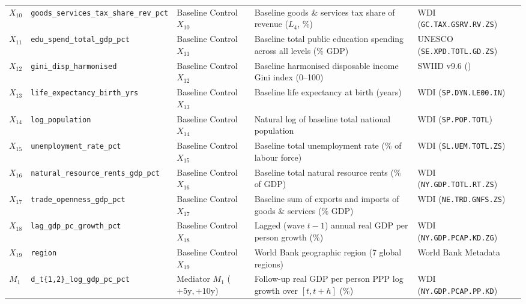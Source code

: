 \documentclass[11pt,a4paper]{article}
\newcommand{\co}{\cellcolor{colodd}}
\newcommand{\ce}{\cellcolor{coleven}}
\begin{document}
\begin{table}[htbp]
{\begin{tabular}{l|l|l|l|l}
    \rowcolor{roweven}
    \textbf{$X_{10}$} & \ce \texttt{goods\_services\_tax\_share\_rev\_pct} & Baseline Control $X_{10}$ & \ce Baseline goods \& services tax share of revenue ($L_4$, \%) & WDI (\texttt{GC.TAX.GSRV.RV.ZS}) \\
    \rowcolor{rowodd}
    \textbf{$X_{11}$} & \co \texttt{edu\_spend\_total\_gdp\_pct} & Baseline Control $X_{11}$ & \co Baseline total public education spending across all levels (\% GDP) & UNESCO (\texttt{SE.XPD.TOTL.GD.ZS}) \\
    \rowcolor{roweven}
    \textbf{$X_{12}$} & \ce \texttt{gini\_disp\_harmonised} & Baseline Control $X_{12}$ & \ce Baseline harmonised disposable income Gini index (0--100) & SWIID v9.6 (\citealt{solt2020swiid}) \\
    \rowcolor{rowodd}
    \textbf{$X_{13}$} & \co \texttt{life\_expectancy\_birth\_yrs} & Baseline Control $X_{13}$ & \co Baseline life expectancy at birth (years) & WDI (\texttt{SP.DYN.LE00.IN}) \\
    \rowcolor{roweven}
    \textbf{$X_{14}$} & \ce \texttt{log\_population} & Baseline Control $X_{14}$ & \ce Natural log of baseline total national population & WDI (\texttt{SP.POP.TOTL}) \\
    \rowcolor{rowodd}
    \textbf{$X_{15}$} & \co \texttt{unemployment\_rate\_pct} & Baseline Control $X_{15}$ & \co Baseline total unemployment rate (\% of labour force) & WDI (\texttt{SL.UEM.TOTL.ZS}) \\
    \rowcolor{roweven}
    \textbf{$X_{16}$} & \ce \texttt{natural\_resource\_rents\_gdp\_pct} & Baseline Control $X_{16}$ & \ce Baseline total natural resource rents (\% of GDP) & WDI (\texttt{NY.GDP.TOTL.RT.ZS}) \\
    \rowcolor{rowodd}
    \textbf{$X_{17}$} & \co \texttt{trade\_openness\_gdp\_pct} & Baseline Control $X_{17}$ & \co Baseline sum of exports and imports of goods \& services (\% GDP) & WDI (\texttt{NE.TRD.GNFS.ZS}) \\
    \rowcolor{roweven}
    \textbf{$X_{18}$} & \ce \texttt{lag\_gdp\_pc\_growth\_pct} & Baseline Control $X_{18}$ & \ce Lagged (wave $t-1$) annual real GDP per person growth (\%) & WDI (\texttt{NY.GDP.PCAP.KD.ZG}) \\
    \rowcolor{rowodd}
    \textbf{$X_{19}$} & \co \texttt{region} & Baseline Control $X_{19}$ & \co World Bank geographic region (7 global regions) & World Bank Metadata \\
    \hline
    \rowcolor{roweven}
    \textbf{$M_1$} & \ce \texttt{d\_t\{1,2\}\_log\_gdp\_pc\_pct} & Mediator $M_1$ ($+5\text{y}, +10\text{y}$) & \ce Follow-up real GDP per person PPP log growth over $[t, t+h]$ (\%) & WDI (\texttt{NY.GDP.PCAP.PP.KD}) \\

\end{tabular}}
\end{table}
\end{document}
